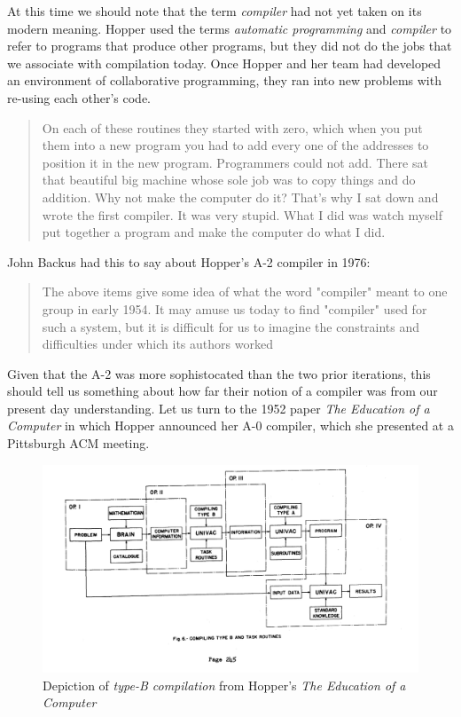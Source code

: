 At this time we should note that the term \textit{compiler} had not yet taken
on its modern meaning. Hopper used the terms \textit{automatic programming} and
\textit{compiler} to refer to programs that produce other programs, but they
did not do the jobs that we associate with compilation today. Once Hopper and
her team had developed an environment of collaborative programming, they ran
into new problems with re-using each other's code.

\begin{quotation}
    On each of these routines they started with zero, which when you put them into
    a new program you had to add every one of the addresses to position it in the
    new program. Programmers could not add.  There sat that beautiful big machine
    whose sole job was to copy things and do addition. Why not make the computer do
    it? That's why I sat down and wrote the first compiler. It was very stupid.
    What I did was watch myself put together a program and make the computer do
    what I did.
    \cite{Hopper_1980_Oral_History}
\end{quotation}

John Backus had this to say about Hopper's A-2 compiler in 1976:
\begin{quotation}
    The above items give some idea of what the word "compiler" meant to one
    group in early 1954. It may amuse us today to find "compiler" used for such
    a system, but it is difficult for us to imagine the constraints and difficulties
    under which its authors worked
    \cite{Backus_1980_Programming_in_America_in_1950s}
\end{quotation}

Given that the A-2 was more sophistocated than the two prior iterations, this
should tell us something about how far their notion of a compiler was from our
present day understanding. Let us turn to the 1952 paper \textit{The Education
    of a Computer} in which Hopper announced her A-0 compiler, which she presented
at a Pittsburgh ACM meeting\cite{education_of_a_computer_1952_hopper}.

\begin{figure}[h]
    \centering
    \includegraphics[width=.7\textwidth]{resource/gh_education_of_a_computer_type_fig_6.png}
    \caption{Depiction of \textit{type-B compilation} from Hopper's \textit{The Education of a Computer}}
    \label{fig:education-of-a-computer-1952-hopper-f6}
\end{figure}

